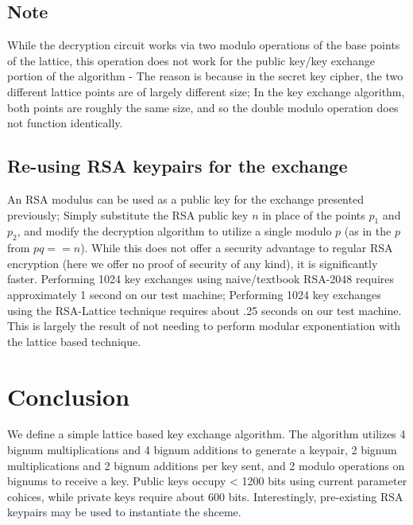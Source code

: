 \documentclass[preprint]{iacrtrans}
\begin{document}
\subsection{Note}
While the decryption circuit works via two modulo operations of the base points of the lattice, this operation does not work for the public key/key exchange portion of the algorithm - The reason is because in the secret key cipher, the two different lattice points are of largely different size; In the key exchange algorithm, both points are roughly the same size, and so the double modulo operation does not function identically.

\subsection{Re-using RSA keypairs for the exchange}
An RSA modulus can be used as a public key for the exchange presented previously; Simply substitute the RSA public key $n$ in place of the points $p_1$ and $p_2$, and modify the decryption algorithm to utilize a single modulo $p$ (as in the $p$ from $pq == n$). While this does not offer a security advantage to regular RSA encryption (here we offer no proof of security of any kind), it is significantly faster. Performing 1024 key exchanges using naive/textbook RSA-2048 requires approximately 1 second on our test machine; Performing 1024 key exchanges using the RSA-Lattice technique requires about .25 seconds on our test machine. This is largely the result of not needing to perform modular exponentiation with the lattice based technique.

\section{Conclusion}
 We define a simple lattice based key exchange algorithm. The algorithm utilizes 4 bignum multiplications and 4 bignum additions to generate a keypair, 2 bignum multiplications and 2 bignum additions per key sent, and 2 modulo operations on bignums to receive a key. Public keys occupy < 1200 bits using current parameter cohices, while private keys require about 600 bits. Interestingly, pre-existing RSA keypairs may be used to instantiate the shceme.
\end{document}
